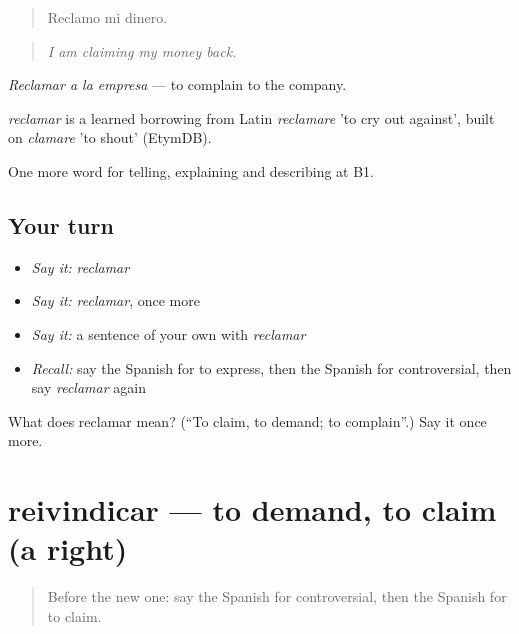 \begin{quote}
Reclamo mi dinero.
\end{quote}

\begin{quote}
\emph{I am claiming my money back.}
\end{quote}

\emph{Reclamar a la empresa} — to complain to the company.

\begin{cousinweb}
\emph{reclamar} is a learned borrowing from Latin \emph{reclamare} 'to cry out against', built on \emph{clamare} 'to shout' (EtymDB).
\end{cousinweb}

\begin{grammarlens}[title={What you've built}]
One more word for telling, explaining and describing at B1.
\end{grammarlens}

\subsection*{Your turn}
\begin{itemize}
\raggedright
  \item \emph{Say it:} \emph{reclamar}
  \item \emph{Say it:} \emph{reclamar}, once more
  \item \emph{Say it:} a sentence of your own with \emph{reclamar}
  \item \emph{Recall:} say the Spanish for to express, then the Spanish for controversial, then say \emph{reclamar} again
\end{itemize}

\begin{tcolorbox}[breakable,colback=teal!4,colframe=teal!35!black,title={Before you move on}]
What does reclamar mean? (\textquotedblleft{}To claim, to demand; to complain\textquotedblright{}.) Say it once more.
\end{tcolorbox}
\section[reivindicar]{reivindicar — to demand, to claim (a right)}

\label{lesson:ES-C604-reivindicar}



\begin{quote}
Before the new one: say the Spanish for controversial, then the Spanish for to claim.
\end{quote}

